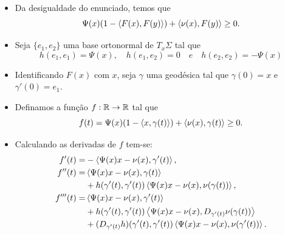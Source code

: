 \documentclass[12pt,a4paper]{beamer}
\theoremstyle{definition}
\begin{document}
\begin{frame}
	\begin{itemize}
		\item Da desigualdade do enunciado, temos que
		\begin{equation*}
		\Psi(x) (1-\left\langle F(x),F(y) \right\rangle) + \left\langle \nu(x),F(y) \right\rangle \geq 0.
		\end{equation*}
		
		\item Seja $\{ e_1,e_2 \}$ uma base ortonormal de $T_x \Sigma$ tal que
		\begin{equation*}
		h(e_1,e_1)=\Psi(x), \quad h(e_1,e_2)=0 \quad e \quad h(e_2,e_2)=-\Psi(x)
		\end{equation*}
		
		\item Identificando $F(x)$ com $x$, seja $\gamma$ uma geodésica tal que $\gamma(0)=x$ e $\gamma'(0)=e_1$.
		
		\item Definamos a função $f: \mathbb R \rightarrow \mathbb R$ tal que
		\begin{equation*}
		f(t) = \Psi(x) (1-\left\langle x,\gamma(t) \right\rangle) + \left\langle \nu(x),\gamma(t) \right\rangle \geq 0.
		\end{equation*}
	\end{itemize}
\end{frame}

\begin{frame}
	\begin{itemize}
		\item Calculando as derivadas de $f$ tem-se:
		\begin{align*}
		f'(t) =& -\left\langle \Psi(x)x - \nu(x),\gamma'(t) \right\rangle,\\
		f''(t) =& \left\langle \Psi(x)x - \nu(x),\gamma(t) \right\rangle\\
		& + h(\gamma'(t),\gamma'(t)) \left\langle \Psi(x)x - \nu(x),\nu(\gamma(t)) \right\rangle,\\
		f'''(t) =& \left\langle \Psi(x)x - \nu(x),\gamma'(t) \right\rangle\\
		& + h(\gamma'(t),\gamma'(t)) \left\langle \Psi(x)x - \nu(x),D_{\gamma'(t)} \nu(\gamma(t)) \right\rangle\\
		& + (D_{\gamma'(t)} h) (\gamma'(t),\gamma'(t)) \left\langle \Psi(x)x - \nu(x),\nu(\gamma'(t)) \right\rangle.
		\end{align*}
	\end{itemize}
\end{frame}
\end{document}
